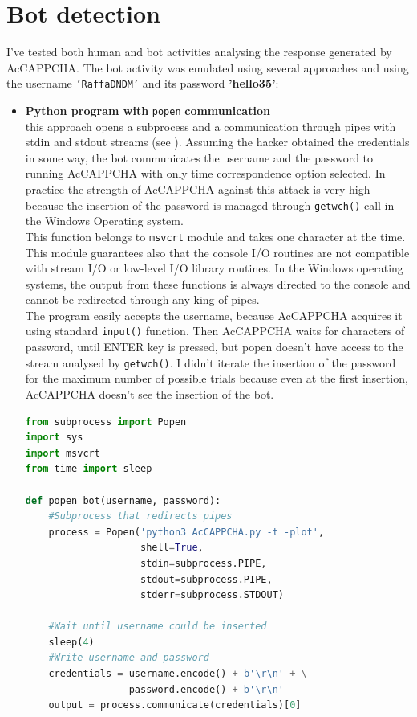 \section{Bot detection}
I've tested both human and bot activities analysing the response generated by AcCAPPCHA. The bot activity was emulated using several approaches and using the username \texttt{'RaffaDNDM'} and its password \textbf{'hello35'}:
\begin{itemize}
\item{\textbf{Python program with} \texttt{popen} \textbf{communication}\\
this approach opens a subprocess and a communication through pipes with stdin and stdout streams (see ). Assuming the hacker obtained the credentials in some way, the bot communicates the username and the password to running AcCAPPCHA with only time correspondence option selected. In practice the strength of AcCAPPCHA against this attack is very high because the insertion of the password is managed through \texttt{getwch()} call in the Windows Operating system. \\
This function belongs to \texttt{msvcrt} module and takes one character at the time. This module guarantees also that the console I/O routines are not compatible with stream I/O or low-level I/O library routines. In the Windows operating systems, the output from these functions is always directed to the console and cannot be redirected through any king of pipes.\\
The program easily accepts the username, because AcCAPPCHA acquires it using standard \texttt{input()} function. Then AcCAPPCHA waits for characters of password, until ENTER key is pressed, but popen doesn't have access to the stream analysed by \texttt{getwch()}. I didn't iterate the insertion of the password for the maximum number of possible trials because even at the first insertion, AcCAPPCHA doesn't see the insertion of the bot.
\begin{lstlisting}[language=python, showstringspaces=false, tabsize=4, basicstyle=\footnotesize, caption={\footnotesize{Bot using popen.}},label={Results:popen_bot}]
from subprocess import Popen
import sys
import msvcrt
from time import sleep

def popen_bot(username, password):
    #Subprocess that redirects pipes
    process = Popen('python3 AcCAPPCHA.py -t -plot',
    				shell=True, 
    				stdin=subprocess.PIPE,
    				stdout=subprocess.PIPE,
    				stderr=subprocess.STDOUT)

    #Wait until username could be inserted
    sleep(4)
    #Write username and password
    credentials = username.encode() + b'\r\n' + \
    			  password.encode() + b'\r\n'
    output = process.communicate(credentials)[0]
    

\end{lstlisting}}
\end{itemize}
